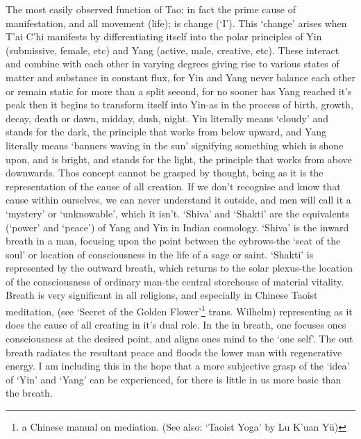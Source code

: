 \documentclass[11pt]{book}
\begin{document}
The most easily observed function of Tao; in fact the prime cause of manifestation, and all movement (life); is change (`I'). This `change' arises when T'ai C'hi manifests by differentiating itself into the polar principles of Yin (submissive, female, etc) and Yang (active, male, creative, etc). These interact and combine with each other in varying degrees giving rise to various states of matter and substance in constant flux, for Yin and Yang never balance each other or remain static for more than a split second, for no sooner has Yang reached it's peak then it begins to transform itself into Yin-as in the process of birth, growth, decay, death or dawn, midday, dush, night. Yin literally means `cloudy' and stands for the dark, the principle that works from below upward, and Yang literally means `banners waving in the sun' signifying something which is shone upon, and is bright, and stands for the light, the principle that works from above downwards. Thos concept cannot be grasped by thought, being as it is the representation of the cause of all creation. If we don't recognise and know that cause within ourselves, we can never understand it outside, and men will call it a `mystery' or `unknowable', which it isn't. `Shiva' and `Shakti' are the equivalents (`power' and `peace') of Yang and Yin in Indian cosmology. `Shiva' is the inward breath in a man, focusing upon the point between the eybrows-the `seat of the soul' or location of consciousness in the life of a sage or saint. `Shakti' is represented by the outward breath, which returns to the solar plexus-the location of the consciousness of ordinary man-the central storehouse of material vitality. Breath is very significant in all religions, and especially in Chinese Taoist meditation, (see `Secret of the Golden Flower'\footnote{a Chinese manual on mediation. (See also: `Taoist Yoga' by Lu K'uan Yü)} trans. Wilhelm) representing as it does the cause of all creating in it's dual role. In the in breath, one focuses ones consciousness at the desired point, and aligns ones mind to the `one self'. The out breath radiates the resultant peace and floods the lower man with regenerative energy. I am including this in the hope that a more subjective grasp of the `idea' of `Yin' and `Yang' can be experienced, for there is little in us more basic than the breath.
\end{document}
